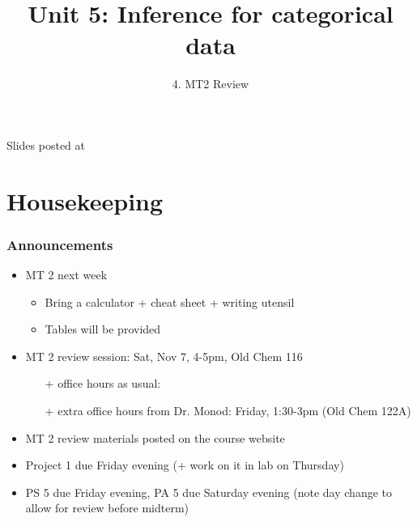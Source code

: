 \documentclass[11pt,containsverbatim,handout,xcolor=xelatex,dvipsnames,table]{beamer}
\title{Unit 5: Inference for categorical data}
\subtitle{4. MT2 Review}
\author{\CourseName}
\date{}
\institute{\InstituteName}
\begin{document}



\begin{frame}[plain]

\titlepage

\vfill

{\scriptsize {} \hfill Slides posted at  \webURL{\CourseSite}}

\addtocounter{framenumber}{-1} 

\end{frame}


\section{Housekeeping}


\begin{frame}
\frametitle{Announcements}

\begin{itemize}

\item MT 2 next week
\begin{itemize}
\item Bring a calculator + cheat sheet + writing utensil
\item Tables will be provided
\end{itemize}

\item MT 2 review session: Sat, Nov 7, 4-5pm, Old Chem 116
\begin{itemize}
\item[+] office hours as usual: 
\item[+] extra office hours from Dr. Monod: Friday, 1:30-3pm (Old Chem 122A)
\end{itemize}

\item MT 2 review materials posted on the course website

\item Project 1 due Friday evening (+ work on it in lab on Thursday)

\item PS 5 due Friday evening, PA 5 due Saturday evening (note day change to allow for review before midterm)

\end{itemize}

\end{frame}
\end{document}
